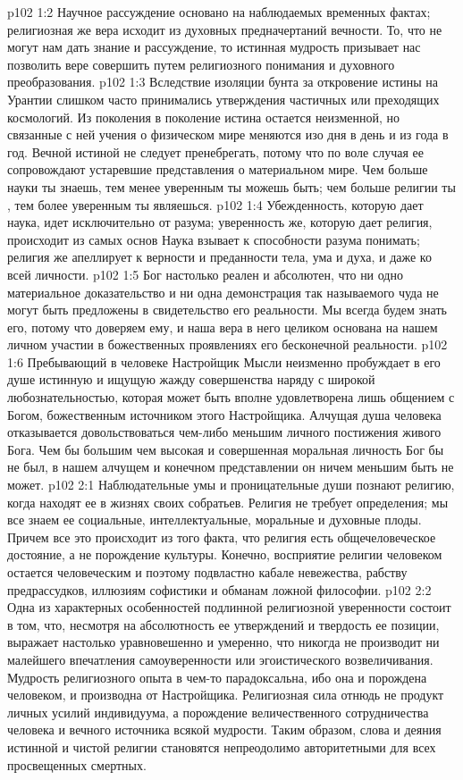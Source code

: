 \vs p102 1:2 Научное рассуждение основано на наблюдаемых временных фактах; религиозная же вера исходит из духовных предначертаний вечности. То, что не могут нам дать знание и рассуждение, то истинная мудрость призывает нас позволить вере совершить путем религиозного понимания и духовного преобразования.
\vs p102 1:3 Вследствие изоляции бунта за откровение истины на Урантии слишком часто принимались утверждения частичных или преходящих космологий. Из поколения в поколение истина остается неизменной, но связанные с ней учения о физическом мире меняются изо дня в день и из года в год. Вечной истиной не следует пренебрегать, потому что по воле случая ее сопровождают устаревшие представления о материальном мире. Чем больше науки ты знаешь, тем менее уверенным ты можешь быть; чем больше религии ты , тем более уверенным ты являешься.
\vs p102 1:4 Убежденность, которую дает наука, идет исключительно от разума; уверенность же, которую дает религия, происходит из самых основ  Наука взывает к способности разума понимать; религия же апеллирует к верности и преданности тела, ума и духа, и даже ко всей личности.
\vs p102 1:5 \pc Бог настолько реален и абсолютен, что ни одно материальное доказательство и ни одна демонстрация так называемого чуда не могут быть предложены в свидетельство его реальности. Мы всегда будем знать его, потому что доверяем ему, и наша вера в него целиком основана на нашем личном участии в божественных проявлениях его бесконечной реальности.
\vs p102 1:6 \pc Пребывающий в человеке Настройщик Мысли неизменно пробуждает в его душе истинную и ищущую жажду совершенства наряду с широкой любознательностью, которая может быть вполне удовлетворена лишь общением с Богом, божественным источником этого Настройщика. Алчущая душа человека отказывается довольствоваться чем\hyp{}либо меньшим личного постижения живого Бога. Чем бы большим чем высокая и совершенная моральная личность Бог бы не был, в нашем алчущем и конечном представлении он ничем меньшим быть не может.
\vs p102 2:1 Наблюдательные умы и проницательные души познают религию, когда находят ее в жизнях своих собратьев. Религия не требует определения; мы все знаем ее социальные, интеллектуальные, моральные и духовные плоды. Причем все это происходит из того факта, что религия есть общечеловеческое достояние, а не порождение культуры. Конечно, восприятие религии человеком остается человеческим и поэтому подвластно кабале невежества, рабству предрассудков, иллюзиям софистики и обманам ложной философии.
\vs p102 2:2 Одна из характерных особенностей подлинной религиозной уверенности состоит в том, что, несмотря на абсолютность ее утверждений и твердость ее позиции, выражает настолько уравновешенно и умеренно, что никогда не производит ни малейшего впечатления самоуверенности или эгоистического возвеличивания. Мудрость религиозного опыта в чем\hyp{}то парадоксальна, ибо она и порождена человеком, и производна от Настройщика. Религиозная сила отнюдь не продукт личных усилий индивидуума, а порождение величественного сотрудничества человека и вечного источника всякой мудрости. Таким образом, слова и деяния истинной и чистой религии становятся непреодолимо авторитетными для всех просвещенных смертных.
